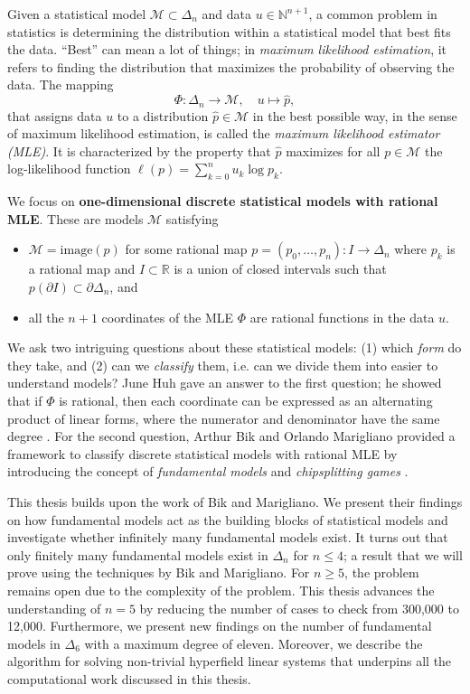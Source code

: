 Given a statistical model \( \mathcal{M} \subset \Delta_n \) and data \( u \in \mathbb{N}^{n+1} \), a common problem in statistics is determining the distribution within a statistical model that best fits the data. ``Best'' can mean a lot of things; in \emph{maximum likelihood estimation}, it refers to finding the distribution that maximizes the probability of observing the data. The mapping
\[
\Phi: \Delta_n \to \mathcal{M}, \quad u \mapsto \hat{p},
\]
that assigns data \( u \) to a distribution \( \hat{p} \in \mathcal{M} \) in the best possible way, in the sense of maximum likelihood estimation, is called the \emph{maximum likelihood estimator (MLE)}. It is characterized by the property that \( \hat{p} \) maximizes for all \( p \in \mathcal{M} \) the log-likelihood function \( \ell(p) = \sum_{k=0}^n u_k \log p_k \).

We focus on \textbf{{one-dimensional {discrete} {statistical} {models} with rational MLE}}. These are models \( \mathcal{M} \) satisfying 
\begin{itemize}
    \item \( \mathcal{M} = \mathrm{image}(p) \) for some rational map \( p = (p_0, \dots, p_n): I \to \Delta_n \) where \( p_k \) is a rational map and \( I \subset \mathbb{R} \) is a union of closed intervals such that  \( p(\partial I) \subset \partial \Delta_n \), and
    \item all the \( n+1 \) coordinates of the MLE \( \Phi \) are rational functions in the data \( u \).
\end{itemize}

We ask two intriguing questions about these statistical models: (1) which \emph{form} do they take, and (2) can we \emph{classify} them, i.e. can we divide them into easier to understand models? June Huh gave an answer to the first question; he showed that if \( \Phi \) is rational, then each coordinate can be expressed as an alternating product of linear forms, where the numerator and denominator have the same degree \cite{huh2013varieties, huh2013maximum, duarte2021discrete}. For the second question, Arthur Bik and Orlando Marigliano provided a framework to classify discrete statistical models with rational MLE by introducing the concept of \emph{fundamental models} and \emph{chipsplitting games} \cite{bik2022classifying}.

This thesis builds upon the work of Bik and Marigliano. We present their findings on how fundamental models act as the building blocks of statistical models and investigate whether infinitely many fundamental models exist. It turns out that only finitely many fundamental models exist in \( \Delta_n \) for \( n \leq 4 \); a result that we will prove using the techniques by Bik and Marigliano. For \( n \geq 5 \), the problem remains open due to the complexity of the problem. This thesis advances the understanding of \( n = 5 \) by reducing the number of cases to check from 300,000 to 12,000. Furthermore, we present new findings on the number of fundamental models in \( \Delta_6 \) with a maximum degree of eleven. Moreover, we describe the algorithm for solving non-trivial hyperfield linear systems that underpins all the computational work discussed in this thesis. 

